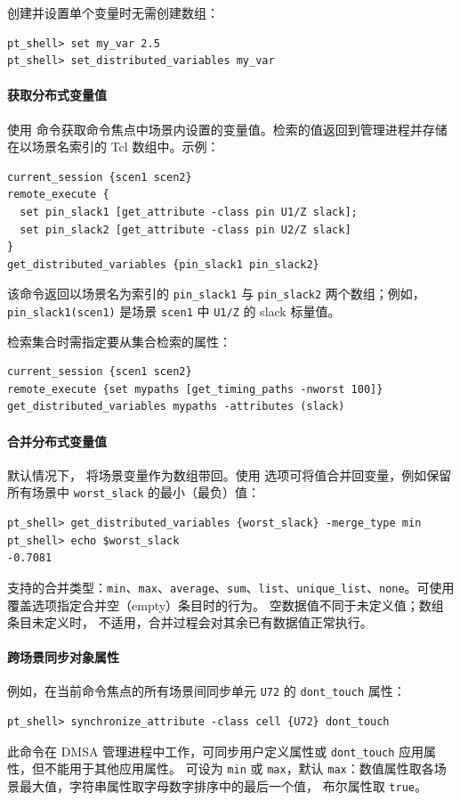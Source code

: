 创建并设置单个变量时无需创建数组：
\begin{lstlisting}
pt_shell> set my_var 2.5
pt_shell> set_distributed_variables my_var
\end{lstlisting}

\paragraph{获取分布式变量值}
使用  命令获取命令焦点中场景内设置的变量值。检索的值返回到管理进程并存储在以场景名索引的 Tcl 数组中。示例：
\begin{lstlisting}
current_session {scen1 scen2}
remote_execute {
  set pin_slack1 [get_attribute -class pin U1/Z slack];
  set pin_slack2 [get_attribute -class pin U2/Z slack]
}
get_distributed_variables {pin_slack1 pin_slack2}
\end{lstlisting}

该命令返回以场景名为索引的 \texttt{pin\_slack1} 与
\texttt{pin\_slack2} 两个数组；例如，
\texttt{pin\_slack1(scen1)} 是场景 \texttt{scen1} 中
\texttt{U1/Z} 的 slack 标量值。

检索集合时需指定要从集合检索的属性：
\begin{lstlisting}
current_session {scen1 scen2}
remote_execute {set mypaths [get_timing_paths -nworst 100]}
get_distributed_variables mypaths -attributes (slack)
\end{lstlisting}

\paragraph{合并分布式变量值}
默认情况下， 将场景变量作为数组带回。使用  选项可将值合并回变量，例如保留所有场景中 \texttt{worst\_slack} 的最小（最负）值：
\begin{lstlisting}
pt_shell> get_distributed_variables {worst_slack} -merge_type min
pt_shell> echo $worst_slack
-0.7081
\end{lstlisting}

 支持的合并类型：\texttt{min}、\texttt{max}、\texttt{average}、\texttt{sum}、\texttt{list}、\texttt{unique\_list}、\texttt{none}。可使用  覆盖选项指定合并空（empty）条目时的行为。
空数据值不同于未定义值；数组条目未定义时，
 不适用，合并过程会对其余已有数据值正常执行。

\paragraph{跨场景同步对象属性}
例如，在当前命令焦点的所有场景间同步单元 \texttt{U72} 的
\texttt{dont\_touch} 属性：
\begin{lstlisting}
pt_shell> synchronize_attribute -class cell {U72} dont_touch
\end{lstlisting}
此命令在 DMSA 管理进程中工作，可同步用户定义属性或
\texttt{dont\_touch} 应用属性，但不能用于其他应用属性。
 可设为 \texttt{min} 或 \texttt{max}，默认
\texttt{max}：数值属性取各场景最大值，字符串属性取字母数字排序中的最后一个值，
布尔属性取 \texttt{true}。


